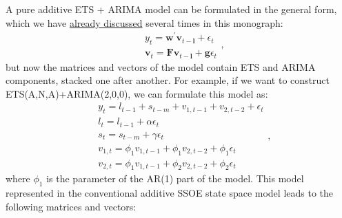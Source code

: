 \documentclass[
]{book}
\theoremstyle{definition}
\theoremstyle{definition}
\theoremstyle{definition}
\theoremstyle{definition}
\theoremstyle{remark}
\begin{document}
A pure additive ETS + ARIMA model can be formulated in the general form, which we have \protect\hyperlink{ADAMETSPureAdditive}{already discussed} several times in this monograph:
\begin{equation*}
  \begin{aligned}
    &{y}_{t} = \mathbf{w}^\prime \mathbf{v}_{t-\mathbf{l}} + \epsilon_t \\
    &\mathbf{v}_{t} = \mathbf{F} \mathbf{v}_{t-\mathbf{l}} + \mathbf{g} \epsilon_t
  \end{aligned},
\end{equation*}
but now the matrices and vectors of the model contain ETS and ARIMA components, stacked one after another. For example, if we want to construct ETS(A,N,A)+ARIMA(2,0,0), we can formulate this model as:
\begin{equation}
  \begin{aligned}
    &{y}_{t} = l_{t-1} + s_{t-m} + v_{1,t-1} + v_{2,t-2} + \epsilon_t \\
    &l_t = l_{t-1} + \alpha \epsilon_t \\
    &s_t = s_{t-m} + \gamma \epsilon_t \\
    &v_{1,t} = \phi_1 v_{1,t-1} + \phi_1 v_{2,t-2} + \phi_1 \epsilon_t \\
    &v_{2,t} = \phi_1 v_{1,t-1} + \phi_2 v_{2,t-2} + \phi_2 \epsilon_t 
  \end{aligned},
  \label{eq:ADAMETSARIMAANA100}
\end{equation}
where \(\phi_1\) is the parameter of the AR(1) part of the model. This model represented in the conventional additive SSOE state space model leads to the following matrices and vectors:
\end{document}
